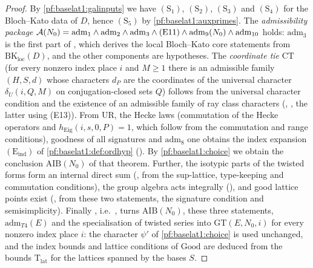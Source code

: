 \begin{proof}
By \cref{pf:baselat1:galinputs} we have $(\mathrm{S}_1)$, $(\mathrm{S}_2)$,
$(\mathrm{S}_3)$ and $(\mathrm{S}_4)$ for the Bloch--Kato data of $D$, hence
$(\mathrm{S}_5)$ by \cref{pf:baselat1:auxprimes}. The \emph{admissibility package}
$\mathcal{A}(N_0)=\mathrm{adm}_1\wedge\mathrm{adm}_2\wedge\mathrm{adm}_3\wedge\textup{(E11)}
\wedge\mathrm{adm}_9(N_0)\wedge\mathrm{adm}_{10}$ holds: $\mathrm{adm}_3$ is the first part of
, which derives the local Bloch--Kato core
statements from $\mathrm{BK}_{\mathrm{loc}}(D)$, and the other components are hypotheses. The \emph{coordinate tie}
$\mathrm{CT}$ (for every nonzero index place $i$ and $M\ge1$ there is an admissible family $(H,S,d)$ whose
characters $d_P$ are the coordinates of the universal character $\delta_U(i,Q,M)$ on conjugation-closed sets $Q$)
follows from the universal character condition and the existence of an admissible family of ray class characters
(, ,
the latter using (E13)). From $\mathrm{UR}$, the Hecke laws (commutation of the Hecke operators and
$h_{\mathrm{Eig}}(i,s,0,P)=1$, which follow from the commutation and range conditions), goodness of all signatures
and $\mathrm{adm}_8$ one obtains the index expansion $(\mathrm{E}_{\mathrm{ind}})$ of \cref{pf:baselat1:def:ordhyp}
(). By \cref{pf:baselat1:choice} we obtain the conclusion
$\mathrm{AIB}(N_0)$ of that theorem. Further, the isotypic parts of the twisted forms form an internal direct
sum (, from the sup-lattice, type-keeping and commutation
conditions), the group algebra acts integrally (), and good
lattice points exist (, from these two statements, the
signature condition and semisimplicity). Finally , i.e.\
, turns
$\mathrm{AIB}(N_0)$, these three statements, $\mathrm{adm}_{T4}(E)$ and the specialisation of
twisted series into $\mathrm{GT}(E,N_0,i)$ for every nonzero index place $i$: the character
$\psi'$ of \cref{pf:baselat1:choice} is used unchanged, and the index bounds and lattice conditions of
$\mathrm{Good}$ are deduced from the bounds $\mathrm{T}_{\mathrm{lat}}$ for the lattices spanned by the bases $S$.
\end{proof}

